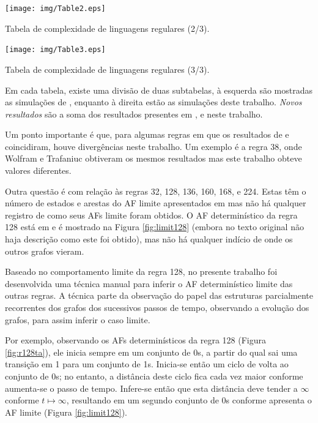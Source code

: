\documentclass[12pt,a4paper]{article}
\begin{document}
\begin{table}
\centering
\texttt{[image: img/Table2.eps]}
\caption{Tabela de complexidade de linguagens regulares (2/3).}
\label{tbl:Table2}
\end{table}

\begin{table}
\centering
\texttt{[image: img/Table3.eps]}
\caption{Tabela de complexidade de linguagens regulares (3/3).}
\label{tbl:Table3}
\end{table}

Em cada tabela, existe uma divisão de duas subtabelas, à esquerda são
mostradas as simulações de , enquanto à direita
estão as simulações deste trabalho. \textit{Novos resultados} são a soma
dos resultados presentes em , 
e neste trabalho.

Um ponto importante é que, para algumas regras em que os resultados de
 e  coincidiram, houve
divergências neste trabalho. Um exemplo é a regra 38, onde Wolfram e
Trafaniuc obtiveram os mesmos resultados mas este trabalho obteve valores
diferentes.

Outra questão é com relação às regras 32, 128, 136, 160, 168, e 224. Estas têm
o número de estados e arestas do AF limite apresentados em
 mas não há qualquer registro de como seus AFs limite
foram  obtidos. O AF determinístico da regra 128 está
em  e é mostrado na Figura \ref{fig:limit128} (embora
no texto original não haja descrição como este foi obtido), mas
não há qualquer indício de onde os outros grafos vieram.

Baseado no comportamento limite da regra 128, no presente trabalho foi
desenvolvida uma técnica manual para inferir o AF determinístico limite
das outras regras.  A técnica parte da observação do papel das estruturas
parcialmente recorrentes dos grafos dos sucessivos passos de tempo,
observando a evolução dos grafos, para assim inferir o caso limite.

Por exemplo, observando os AFs determinísticos da regra 128 (Figura \ref{fig:r128ta}), ele
inicia sempre em um conjunto de 0s, a partir do qual sai uma transição em 1 para um
conjunto de 1s. Inicia-se então um ciclo de volta ao conjunto de 0s; no entanto,
a distância deste ciclo fica cada vez maior conforme aumenta-se o passo de
tempo. Infere-se então que esta distância deve tender a $\infty$ conforme
$t \mapsto \infty$, resultando em um segundo conjunto de 0s conforme apresenta o AF
limite (Figura \ref{fig:limit128}).
\end{document}
